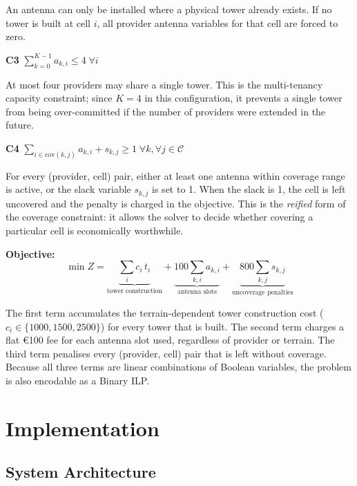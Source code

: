 \documentclass{llncs}
\begin{document}
\noindent An antenna can only be installed where a physical tower already exists.
If no tower is built at cell $i$, all provider antenna variables for that cell
are forced to zero.

\smallskip
\noindent\textbf{C3} \quad $\displaystyle\sum_{k=0}^{K-1} a_{k,i} \leq 4 \;\forall i$

\noindent At most four providers may share a single tower. This is the
multi-tenancy capacity constraint; since $K = 4$ in this configuration, it
prevents a single tower from being over-committed if the number of providers
were extended in the future.

\smallskip
\noindent\textbf{C4} \quad
$\displaystyle\sum_{i \in \mathrm{cov}(k,j)} a_{k,i} + s_{k,j} \geq 1
\;\forall k,\forall j \in \mathcal{C}$

\noindent For every (provider, cell) pair, either at least one antenna within
coverage range is active, or the slack variable $s_{k,j}$ is set to 1. When the
slack is 1, the cell is left uncovered and the penalty is charged in the
objective. This is the \emph{reified} form of the coverage constraint: it
allows the solver to decide whether covering a particular cell is economically
worthwhile.

\smallskip\noindent\textbf{Objective:}
\[
\min Z = \underbrace{\sum_{i} c_i \, t_i}_{\text{tower construction}}
       + \underbrace{100 \sum_{k,i} a_{k,i}}_{\text{antenna slots}}
       + \underbrace{800 \sum_{k,j} s_{k,j}}_{\text{uncoverage penalties}}
\]

The first term accumulates the terrain-dependent tower construction cost
($c_i \in \{1000, 1500, 2500\}$) for every tower that is built. The second
term charges a flat €100 fee for each antenna slot used, regardless of provider
or terrain. The third term penalises every (provider, cell) pair that is left
without coverage. Because all three terms are linear combinations of Boolean
variables, the problem is also encodable as a Binary ILP.

\section{Implementation}
\label{sec:impl}

\subsection{System Architecture}
\end{document}
